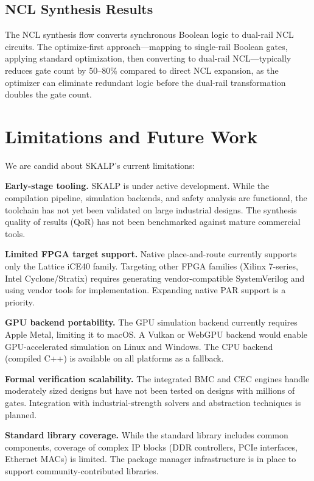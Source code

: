 \documentclass[conference]{IEEEtran}
\begin{document}
\subsection{NCL Synthesis Results}

The NCL synthesis flow converts synchronous Boolean logic to dual-rail NCL circuits. The optimize-first approach---mapping to single-rail Boolean gates, applying standard optimization, then converting to dual-rail NCL---typically reduces gate count by 50--80\% compared to direct NCL expansion, as the optimizer can eliminate redundant logic before the dual-rail transformation doubles the gate count.

\section{Limitations and Future Work}
\label{sec:limitations}

We are candid about SKALP's current limitations:

\textbf{Early-stage tooling.} SKALP is under active development. While the compilation pipeline, simulation backends, and safety analysis are functional, the toolchain has not yet been validated on large industrial designs. The synthesis quality of results (QoR) has not been benchmarked against mature commercial tools.

\textbf{Limited FPGA target support.} Native place-and-route currently supports only the Lattice iCE40 family. Targeting other FPGA families (Xilinx 7-series, Intel Cyclone/Stratix) requires generating vendor-compatible SystemVerilog and using vendor tools for implementation. Expanding native PAR support is a priority.

\textbf{GPU backend portability.} The GPU simulation backend currently requires Apple Metal, limiting it to macOS. A Vulkan or WebGPU backend would enable GPU-accelerated simulation on Linux and Windows. The CPU backend (compiled C++) is available on all platforms as a fallback.

\textbf{Formal verification scalability.} The integrated BMC and CEC engines handle moderately sized designs but have not been tested on designs with millions of gates. Integration with industrial-strength solvers and abstraction techniques is planned.

\textbf{Standard library coverage.} While the standard library includes common components, coverage of complex IP blocks (DDR controllers, PCIe interfaces, Ethernet MACs) is limited. The package manager infrastructure is in place to support community-contributed libraries.
\end{document}
